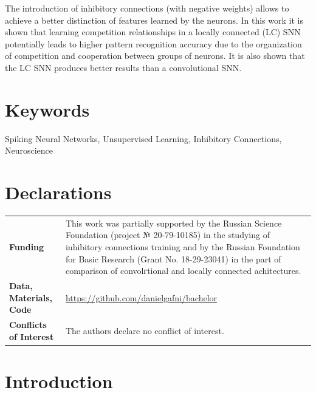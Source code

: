\documentclass[a4paper,10pt]{article}
\begin{document}
The introduction of inhibitory connections (with negative weights) allows to achieve a better distinction of features learned by the neurons. In this work it is shown that learning competition relationships in a locally connected (LC) SNN potentially leads to higher pattern recognition accuracy due to the organization of competition and cooperation between groups of neurons. It is also shown that the LC SNN produces better results than a convolutional SNN.

\section*{Keywords}
Spiking Neural Networks, Unsupervised Learning, Inhibitory Connections, Neuroscience

\section*{Declarations}

\begin{flushleft}
 \begin{tabularx}{\textwidth}{lm{10cm}}
  \textbf{Funding} & {This work was partially supported by the Russian Science Foundation (project № 20-79-10185) in the studying of inhibitory connections training and by the Russian Foundation for Basic Research (Grant No. 18-29-23041) in the part of comparison of convolгtional and locally connected achitectures.} \\
  \textbf{Data, Materials, Code} & {\href{https://github.com/danielgafni/bachelor}{https://github.com/danielgafni/bachelor}} \\
  \textbf{Conflicts of Interest} & {The authors declare no conflict of interest.} \\
 \end{tabularx}
\end{flushleft}

\pagebreak 

\section*{Introduction}
\end{document}
